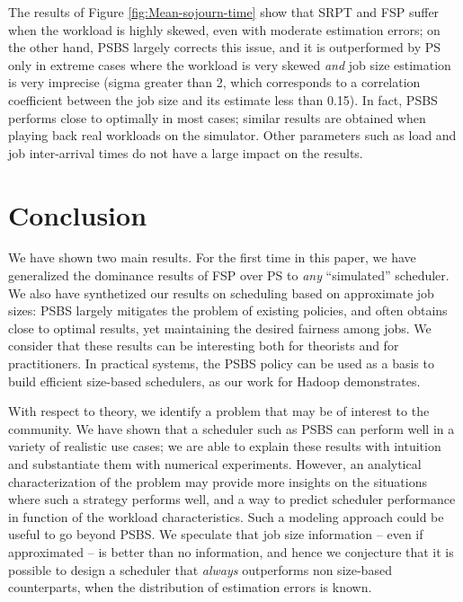 \documentclass[11pt,oneside,english]{amsart}
\numberwithin{equation}{section}
\numberwithin{figure}{section}
\theoremstyle{definition}
\theoremstyle{plain}
\begin{document}
The results of Figure \ref{fig:Mean-sojourn-time} show that SRPT and FSP
suffer when the workload is highly skewed, even with moderate estimation errors; 
on the other hand, PSBS largely corrects this issue,
and it is outperformed by PS only in extreme cases 
where the workload is very skewed \emph{and} job size estimation is 
very imprecise (sigma greater than 2, which corresponds to a correlation 
coefficient between the job size and its estimate less than 0.15). 
In fact, PSBS performs close to optimally in most cases; similar results
are obtained when playing back real workloads on the simulator. Other
parameters such as load and job inter-arrival times do not have a
large impact on the results.


\section{\label{sec:Conclusion}Conclusion}

We have shown two main results. For the first time in this paper,
we have generalized the dominance results of FSP over PS to \emph{any} ``simulated'' scheduler. We also have synthetized our results on scheduling based on approximate job sizes: PSBS largely mitigates the problem of existing policies, and often obtains close to optimal results, yet maintaining the desired fairness among jobs.
We consider that these results can be interesting both for theorists
and for practitioners. In practical systems, the PSBS policy can be used as a basis to build efficient size-based schedulers, as our work for Hadoop \cite{Pastorelli2013} demonstrates.






With respect to theory, we identify a problem that may be of 
interest to the community. We have shown that a scheduler 
such as PSBS can perform well in a variety of realistic use cases; 
we are able to explain these results with intuition and substantiate 
them with numerical experiments. However, 
an analytical characterization of the problem may provide more
insights on the situations where such a strategy performs 
well, and a way to predict scheduler performance in function of the 
workload characteristics.
Such a modeling approach could be useful to go beyond PSBS.
We speculate that job size information -- even if
approximated -- is 
better than no information, and hence we
conjecture that it is possible to design a scheduler that \emph{always} 
outperforms non size-based counterparts, when the distribution of estimation
errors is known.



\end{document}
